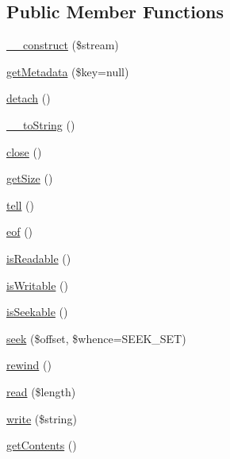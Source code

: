 \subsection*{Public Member Functions}
\begin{DoxyCompactItemize}
\item 
\mbox{\hyperlink{class_pes_1_1_http_1_1_stream_ab7e7980c180f645083645f626374b690}{\+\_\+\+\_\+construct}} (\$stream)
\item 
\mbox{\hyperlink{class_pes_1_1_http_1_1_stream_a710dbc5f59acad99675d3d608f46fe7f}{get\+Metadata}} (\$key=null)
\item 
\mbox{\hyperlink{class_pes_1_1_http_1_1_stream_aa4c7e8ce5147b0a22d6f2543c017a937}{detach}} ()
\item 
\mbox{\hyperlink{class_pes_1_1_http_1_1_stream_a7516ca30af0db3cdbf9a7739b48ce91d}{\+\_\+\+\_\+to\+String}} ()
\item 
\mbox{\hyperlink{class_pes_1_1_http_1_1_stream_aa69c8bf1f1dcf4e72552efff1fe3e87e}{close}} ()
\item 
\mbox{\hyperlink{class_pes_1_1_http_1_1_stream_a75cce10cdf81be6dc84881c28b3379b7}{get\+Size}} ()
\item 
\mbox{\hyperlink{class_pes_1_1_http_1_1_stream_a8153e55ed7b27a62988843a2dd66c845}{tell}} ()
\item 
\mbox{\hyperlink{class_pes_1_1_http_1_1_stream_ada3799f740f09e3689d0054629e87feb}{eof}} ()
\item 
\mbox{\hyperlink{class_pes_1_1_http_1_1_stream_a40c3664bb217c4922a289cc97e9cdceb}{is\+Readable}} ()
\item 
\mbox{\hyperlink{class_pes_1_1_http_1_1_stream_a63ce3bd392eed625d7e91db404b6fa3c}{is\+Writable}} ()
\item 
\mbox{\hyperlink{class_pes_1_1_http_1_1_stream_a1fba032525b1840361a44bc001252693}{is\+Seekable}} ()
\item 
\mbox{\hyperlink{class_pes_1_1_http_1_1_stream_aa2ee0a47a0c37ae7ca7a04df34fc6d7a}{seek}} (\$offset, \$whence=S\+E\+E\+K\+\_\+\+S\+ET)
\item 
\mbox{\hyperlink{class_pes_1_1_http_1_1_stream_ae619dcf2218c21549cb65d875bbc6c9c}{rewind}} ()
\item 
\mbox{\hyperlink{class_pes_1_1_http_1_1_stream_a2acacba716a933935d63b2bacf52cff6}{read}} (\$length)
\item 
\mbox{\hyperlink{class_pes_1_1_http_1_1_stream_abf9a4eaa4b5194cc450e80c1a0c23a5a}{write}} (\$string)
\item 
\mbox{\hyperlink{class_pes_1_1_http_1_1_stream_a14814e04b348120748912692645f3a75}{get\+Contents}} ()
\end{DoxyCompactItemize}
